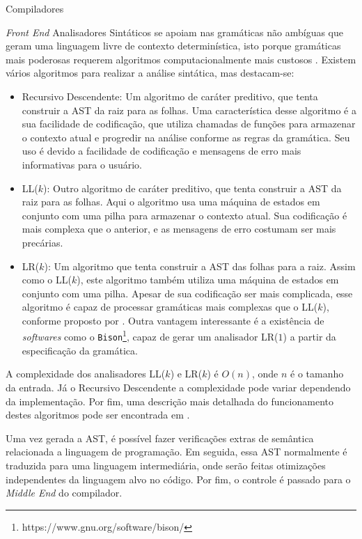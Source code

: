 \begin{section}{Compiladores}
\begin{subsection}{\textit{Front End}}
    Analisadores Sintáticos se apoiam nas gramáticas não ambíguas que geram uma
linguagem livre de contexto determinística, isto porque gramáticas mais
poderosas requerem algoritmos computacionalmente mais custosos
\citep{sipser2012}. Existem vários algoritmos para realizar a análise sintática,
mas destacam-se:
\begin{itemize}
	\item Recursivo Descendente: Um algoritmo de caráter preditivo, que tenta
	    construir a AST da raiz para as folhas. Uma característica desse algoritmo
		é a sua facilidade de codificação, que utiliza chamadas de funções para
		armazenar o contexto atual e progredir na análise conforme as regras da
		gramática. Seu uso é devido a facilidade de codificação e mensagens de
		erro mais informativas para o usuário.

    \item LL($k$): Outro algoritmo de caráter preditivo, que tenta construir a AST da
        raiz para as folhas. Aqui o algoritmo usa uma máquina de estados em conjunto
		com uma pilha para armazenar o contexto atual. Sua codificação é mais
		complexa que o anterior, e as mensagens de erro costumam ser mais precárias.

    \item LR($k$): Um algoritmo que tenta construir a AST das folhas para a raiz.
		  Assim como o LL($k$), este algoritmo também utiliza uma máquina de estados
		  em conjunto com uma pilha. Apesar de sua codificação ser mais complicada,
          esse algoritmo é capaz de processar gramáticas mais complexas que
          o LL($k$), conforme proposto por \cite{knuth1965translation}.
          Outra vantagem interessante é a existência de
          \textit{softwares} como o
          \texttt{Bison}\footnote{https://www.gnu.org/software/bison/}, capaz
          de gerar um analisador LR($1$) a partir da especificação da gramática.
\end{itemize}
	A complexidade dos analisadores LL($k$) e LR($k$) é $O(n)$, onde $n$ 
	é o tamanho da entrada. Já o Recursivo Descendente a complexidade pode variar
	dependendo da implementação.
    Por fim, uma descrição mais detalhada do funcionamento destes algoritmos
pode ser encontrada em \citep{appel2004modern}.

    Uma vez gerada a AST, é possível fazer verificações extras de semântica
relacionada a linguagem de programação. Em seguida, essa AST normalmente é
traduzida para uma linguagem intermediária, onde serão feitas otimizações
independentes da linguagem alvo no código. Por fim, o controle é passado
para o \textit{Middle End} do compilador.


\end{subsection}
\end{section}
